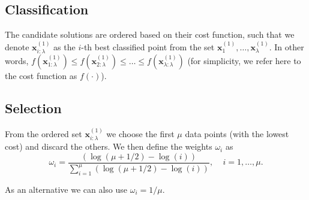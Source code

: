 \subsection{Classification}
The candidate solutions are ordered based on their cost function, such that we denote $\mathbf{x}^{(1)}_{i:\lambda}$ as the $i$-th best classified point from the set $\mathbf{x}^{(1)}_1,\ldots,\mathbf{x}^{(1)}_\lambda$. In other words, $f(\mathbf{x}_{1:\lambda}^{(1)})\leq f(\mathbf{x}_{2:\lambda}^{(1)})\leq\ldots\leq f(\mathbf{x}_{\lambda:\lambda}^{(1)})$ (for simplicity, we refer here to the cost function as $f(\cdot)$).

\subsection{Selection}
From the ordered set $\mathbf{x}^{(1)}_{i:\lambda}$ we choose the first $\mu$ data points (with the lowest cost) and discard the others.
We then define the weights $\omega_i$ as
\begin{equation}
\omega_i=\frac{\left(\log\left(\mu+1/2\right)-\log(i)\right)}{\sum_{i=1}^\mu\left(\log\left(\mu+1/2\right)-\log(i)\right)}, \ \ \ \ \ i=1,\ldots,\mu.
\end{equation}

As an alternative we can also use $\omega_i=1/\mu$.


